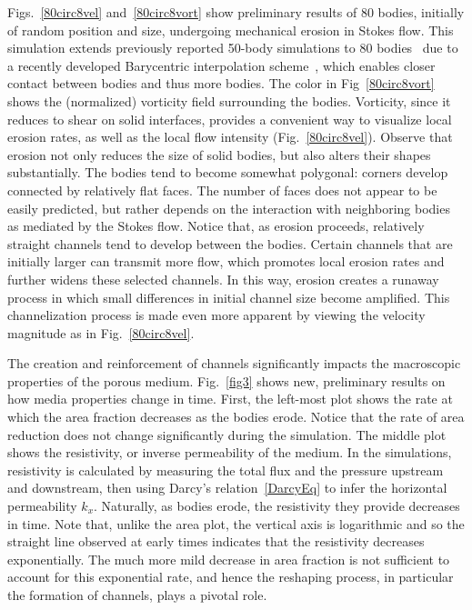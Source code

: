 \documentclass[11pt]{article}
\begin{document}
Figs.~\ref{80circ8vel} and~\ref{80circ8vort} show preliminary results of 80 bodies, initially of random position and size, undergoing mechanical erosion in Stokes flow. This simulation extends previously reported 50-body simulations to 80 bodies~\cite{Quaife2018} due to a recently developed Barycentric interpolation scheme~\cite{bar2014, bar-wu-vee2015, chi-moo-qua2019}, which enables closer contact between bodies and thus more bodies. The color in Fig~\ref{80circ8vort} shows the (normalized) vorticity field surrounding the bodies. Vorticity, since it reduces to shear on solid interfaces, provides a convenient way to visualize local erosion rates, as well as the local flow intensity (Fig.~\ref{80circ8vel}).  Observe that erosion not only reduces the size of solid bodies, but also alters their shapes substantially. The bodies tend to become somewhat polygonal: corners develop connected by relatively flat faces. The number of faces does not appear to be easily predicted, but rather depends on the interaction with neighboring bodies as mediated by the Stokes flow. Notice that, as erosion proceeds, relatively straight channels tend to develop between the bodies. Certain channels that are initially larger can transmit more flow, which promotes local erosion rates and further widens these selected channels. In this way, erosion creates a runaway process in which small differences in initial channel size become amplified. This channelization process is made even more apparent by viewing the velocity magnitude as in Fig.~\ref{80circ8vel}.
 
The creation and reinforcement of channels significantly impacts the macroscopic properties of the porous medium. Fig.~\ref{fig3} shows new, preliminary results on how media properties change in time. First, the left-most plot shows the rate at which the area fraction decreases as the bodies erode. Notice that the rate of area reduction does not change significantly during the simulation. The middle plot shows the resistivity, or inverse permeability of the medium. In the simulations, resistivity is calculated by measuring the total flux and the pressure upstream and downstream, then using Darcy's relation~\eqref{DarcyEq} to infer the horizontal permeability $k_x$. Naturally, as bodies erode, the resistivity they provide decreases in time. Note that, unlike the area plot, the vertical axis is logarithmic and so the straight line observed at early times indicates that the resistivity decreases exponentially. The much more mild decrease in area fraction is not sufficient to account for this exponential rate, and hence the reshaping process, in particular the formation of channels, plays a pivotal role.  
\end{document}
